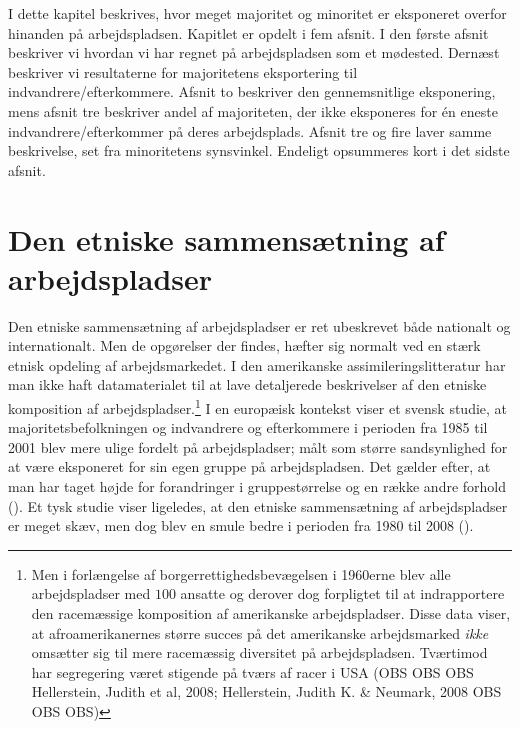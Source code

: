 \documentclass[
]{book}
\begin{document}
I dette kapitel beskrives, hvor meget majoritet og minoritet er eksponeret overfor hinanden på arbejdspladsen. Kapitlet er opdelt i fem afsnit. I den første afsnit beskriver vi hvordan vi har regnet på arbejdspladsen som et mødested. Dernæst beskriver vi resultaterne for majoritetens eksportering til indvandrere/efterkommere. Afsnit to beskriver den gennemsnitlige eksponering, mens afsnit tre beskriver andel af majoriteten, der ikke eksponeres for én eneste indvandrere/efterkommer på deres arbejdsplads. Afsnit tre og fire laver samme beskrivelse, set fra minoritetens synsvinkel. Endeligt opsummeres kort i det sidste afsnit.

\section{Den etniske sammensætning af arbejdspladser}\label{den-etniske-sammensuxe6tning-af-arbejdspladser}

Den etniske sammensætning af arbejdspladser er ret ubeskrevet både nationalt og internationalt. Men de opgørelser der findes, hæfter sig normalt ved en stærk etnisk opdeling af arbejdsmarkedet. I den amerikanske assimileringslitteratur har man ikke haft datamaterialet til at lave detaljerede beskrivelser af den etniske komposition af arbejdspladser.\footnote{Men i forlængelse af borgerrettighedsbevægelsen i 1960erne blev alle arbejdspladser med \(100\) ansatte og derover dog forpligtet til at indrapportere den racemæssige komposition af amerikanske arbejdspladser. Disse data viser, at afroamerikanernes større succes på det amerikanske arbejdsmarked \emph{ikke} omsætter sig til mere racemæssig diversitet på arbejdspladsen. Tværtimod har segregering været stigende på tværs af racer i USA (OBS OBS OBS Hellerstein, Judith et al, 2008; Hellerstein, Judith K. \& Neumark, 2008 OBS OBS OBS)} I en europæisk kontekst viser et svensk studie, at majoritetsbefolkningen og indvandrere og efterkommere i perioden fra 1985 til 2001 blev mere ulige fordelt på arbejdspladser; målt som større sandsynlighed for at være eksponeret for sin egen gruppe på arbejdspladsen. Det gælder efter, at man har taget højde for forandringer i gruppestørrelse og en række andre forhold (). Et tysk studie viser ligeledes, at den etniske sammensætning af arbejdspladser er meget skæv, men dog blev en smule bedre i perioden fra 1980 til 2008 ().
\end{document}
